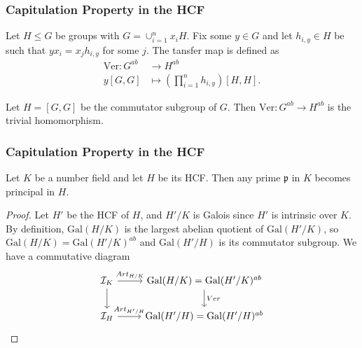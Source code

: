 \documentclass{beamer}
\newcommand{\Gal}{\mathrm{Gal}}
\newcommand{\Cl}{\mathrm{Cl}}
\newcommand{\pp}{\mathfrak{p}}
\newcommand{\af}{\mathfrak{a}}
\theoremstyle{plain}
\begin{document}
\begin{frame}
    \frametitle{Capitulation Property in the HCF}
    \begin{definition}
        Let $H\leq G$ be groups with $G=\cup_{i=1}^n x_iH$. Fix some $y\in G$ and let $h_{i,y}\in H$ be such that $yx_i=x_jh_{i,y}$ for some $j$. \pause The tansfer map is defined as
        \begin{align*}
            \mathrm{Ver}:G^{ab} &\longrightarrow H^{ab} \\
            y[G,G]&\longmapsto \left(\prod_{i=1}^nh_{i,y}\right)[H,H].
        \end{align*}
    \end{definition}
    \pause
    \begin{theorem}
        Let $H=[G,G]$ be the commutator subgroup of $G$. Then $\mathrm{Ver}:G^{ab}\to H^{ab}$ is the trivial homomorphism.
    \end{theorem}
\end{frame}

\begin{frame}[fragile]
    \frametitle{Capitulation Property in the HCF}
    \begin{theorem}
        Let $K$ be a number field and let $H$ be its HCF. Then any prime $\pp$ in $K$ becomes principal in $H$.
    \end{theorem}
    \pause
    \begin{proof}
        Let $H'$ be the HCF of $H$, and $H'/K$ is Galois since $H'$ is intrinsic over $K$. \pause By definition, $\Gal(H/K)$ is the largest abelian quotient of $\Gal(H'/K)$, so $\Gal(H/K)=\Gal(H'/K)^{ab}$ and $\Gal(H'/H)$ is its commutator subgroup. \pause We have a commutative diagram
        \[
        \begin{tikzcd}
            \mathcal{I}_K \arrow[r,"Art_{H/K}"] \arrow[d,""] & \Gal(H/K)=\Gal(H'/K)^{ab} \arrow[d,"Ver"] \\
            \mathcal{I}_H \arrow[r,"Art_{H'/H}"] & \Gal(H'/H)=\Gal(H'/H)^{ab}
        \end{tikzcd}
        \]

    \end{proof}
    
\end{frame}
    
\end{document}

